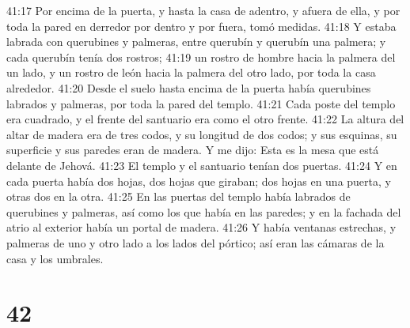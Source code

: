 41:17 Por encima de la puerta, y hasta la casa de adentro, y afuera de ella, y por toda la pared en derredor por dentro y por fuera, tomó medidas.  
41:18 Y estaba labrada con querubines y palmeras, entre querubín y querubín una palmera; y cada querubín tenía dos rostros;  
41:19 un rostro de hombre hacia la palmera del un lado, y un rostro de león hacia la palmera del otro lado, por toda la casa alrededor.  
41:20 Desde el suelo hasta encima de la puerta había querubines labrados y palmeras, por toda la pared del templo.  
41:21 Cada poste del templo era cuadrado, y el frente del santuario era como el otro frente.  
41:22 La altura del altar de madera era de tres codos,  y su longitud de dos codos; y sus esquinas, su superficie y sus paredes eran de madera. Y me dijo: Esta es la mesa que está delante de Jehová.  
41:23 El templo y el santuario tenían dos puertas.  
41:24 Y en cada puerta había dos hojas, dos hojas que giraban; dos hojas en una puerta, y otras dos en la otra.  
41:25 En las puertas del templo había labrados de querubines y palmeras, así como los que había en las paredes; y en la fachada del atrio al exterior había un portal de madera.  
41:26 Y había ventanas estrechas, y palmeras de uno y otro lado a los lados del pórtico; así eran las cámaras de la casa y los umbrales.  

\chapter{42}

